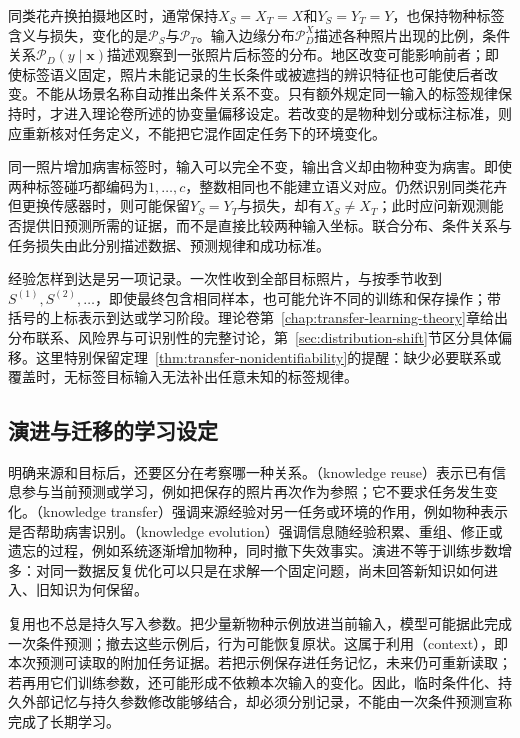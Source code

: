 同类花卉换拍摄地区时，通常保持$X_S=X_T=X$和$Y_S=Y_T=Y$，也保持物种标签含义与损失，变化的是$\mathcal P_S$与$\mathcal P_T$。输入边缘分布$\mathcal P_D^X$描述各种照片出现的比例，条件关系$\mathcal P_D(y\mid\bm{x})$描述观察到一张照片后标签的分布。地区改变可能影响前者；即使标签语义固定，照片未能记录的生长条件或被遮挡的辨识特征也可能使后者改变。不能从场景名称自动推出条件关系不变。只有额外规定同一输入的标签规律保持时，才进入理论卷所述的协变量偏移设定。若改变的是物种划分或标注标准，则应重新核对任务定义，不能把它混作固定任务下的环境变化。

同一照片增加病害标签时，输入可以完全不变，输出含义却由物种变为病害。即使两种标签碰巧都编码为$1,\ldots,c$，整数相同也不能建立语义对应。仍然识别同类花卉但更换传感器时，则可能保留$Y_S=Y_T$与损失，却有$X_S\neq X_T$；此时应问新观测能否提供旧预测所需的证据，而不是直接比较两种输入坐标。联合分布、条件关系与任务损失由此分别描述数据、预测规律和成功标准。

经验怎样到达是另一项记录。一次性收到全部目标照片，与按季节收到$S^{(1)},S^{(2)},\ldots$，即使最终包含相同样本，也可能允许不同的训练和保存操作；带括号的上标表示到达或学习阶段。理论卷第~\ref{chap:transfer-learning-theory}章给出分布联系、风险界与可识别性的完整讨论，第~\ref{sec:distribution-shift}节区分具体偏移。这里特别保留定理~\ref{thm:transfer-nonidentifiability}的提醒：缺少必要联系或覆盖时，无标签目标输入无法补出任意未知的标签规律。

\subsection{演进与迁移的学习设定}
\label{sec:ket-overview-learning-settings}

明确来源和目标后，还要区分在考察哪一种关系。（knowledge reuse）表示已有信息参与当前预测或学习，例如把保存的照片再次作为参照；它不要求任务发生变化。（knowledge transfer）强调来源经验对另一任务或环境的作用，例如物种表示是否帮助病害识别。（knowledge evolution）强调信息随经验积累、重组、修正或遗忘的过程，例如系统逐渐增加物种，同时撤下失效事实。演进不等于训练步数增多：对同一数据反复优化可以只是在求解一个固定问题，尚未回答新知识如何进入、旧知识为何保留。

复用也不总是持久写入参数。把少量新物种示例放进当前输入，模型可能据此完成一次条件预测；撤去这些示例后，行为可能恢复原状。这属于利用（context），即本次预测可读取的附加任务证据。若把示例保存进任务记忆，未来仍可重新读取；若再用它们训练参数，还可能形成不依赖本次输入的变化。因此，临时条件化、持久外部记忆与持久参数修改能够结合，却必须分别记录，不能由一次条件预测宣称完成了长期学习。

